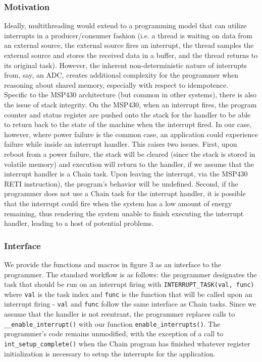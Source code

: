 \documentclass[11pt]{sensys-proc}
\newcommand{\chain}{Chain\xspace}
\begin{document}
\subsubsection{Motivation}
Ideally, multithreading would extend to a programming model that can utilize
interrupts in a producer/consumer fashion (i.e. a thread is waiting on data
from an external source, the external source fires an interrupt, the thread
samples the external source and stores the received data in a buffer, and
the thread returns to its original task). However, the inherent
non-deterministic
nature of interrupts from, say, an ADC, creates additional complexity for the
programmer when reasoning about shared memory, especially with respect to
idempotence.\\
    Specific to the MSP430 architecture (but common in other systems), there is
also the issue of stack integrity. On the MSP430, when an interrupt fires,
the program counter and status register are pushed onto the stack for
the handler to be able to return back to the state of the machine when the
interrupt fired. In our case, however, where power failure is the common
case, an application could experience failure while inside an interrupt
handler. This raises two issues. First, upon reboot from a power failure,
the stack will be cleared (since the stack is stored in volatile memory) and
execution will return to the handler, if we assume that the interrupt handler
is a \chain task. Upon leaving the interrupt, via the MSP430 RETI instruction),
the program's behavior will be undefined. Second, if the programmer does not
use a \chain task for the interrupt handler, it is possible that the interrupt
could fire when the system has a low amount of energy remaining, thus
rendering the system unable to finish executing the interrupt handler,
leading to a host of potential problems.

\subsubsection{Interface}
We provide the functions and macros in figure 3 as an interface to
the programmer. The standard workflow is as follows: the programmer
designates the task that should be run on an interrupt firing
with \texttt{INTERRUPT\_TASK(val, func)} where \texttt{val} is the task
index and \texttt{func} is the function that will be called upon an
interrupt firing - \texttt{val} and \texttt{func} follow the same
interface as \chain tasks. Since we assume that the handler is not
reentrant, the programmer replaces calls to \texttt{\_\_enable\_interrupt()}
with our function \texttt{enable\_interrupts()}.
The programmer's code remains unmodified, with the exception of a call to
\texttt{int\_setup\_complete()} when the \chain program has finished whatever
register initialization is necessary to setup the interrupts for the
application.\\
\end{document}
